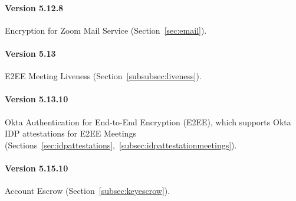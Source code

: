 \paragraph{Version 5.12.8}
Encryption for Zoom Mail Service (Section~\ref{sec:email}).

\paragraph{Version 5.13}
E2EE Meeting Liveness (Section~\ref{subsubsec:liveness}).

\paragraph{Version 5.13.10}
Okta Authentication for End-to-End Encryption (E2EE), which supports Okta IDP attestations for E2EE
Meetings (Sections~\ref{sec:idpattestations},~\ref{subsec:idpattestationmeetings}).

\paragraph{Version 5.15.10}
Account Escrow (Section~\ref{subsec:keyescrow}).
